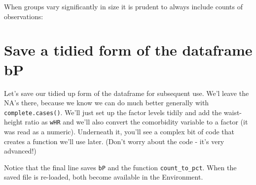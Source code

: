\documentclass[titlepage]{book}\usepackage{knitr}
\begin{document}
When groups vary significantly in size it is prudent to always include  counts of observations:
\begin{knitrout}
\color{fgcolor}
\end{knitrout}


\section{Save a tidied form of the dataframe bP}

Let's save our tidied up form of the dataframe for subsequent use.  We'l leave the NA's there, because we know we can do much better generally with \texttt{complete.cases()}.  We'll just set up the factor levels tidily and add the waist-height ratio as \texttt{wHR} and we'll also convert the comorbidity variable to a factor (it was read as a numeric). Underneath it, you'll see a complex bit of code that creates a function we'll use later.  (Don't worry about the code - it's very advanced!)

Notice that the final line saves \texttt{bP} and the function \texttt{count\_to\_pct}.  When the saved file is re-loaded, both become available in the Environment.
\end{document}
